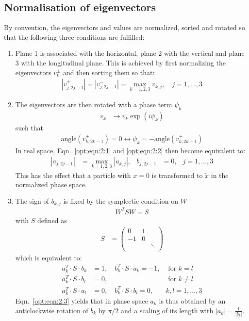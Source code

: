\documentclass[english]{article}
\begin{document}
\subsection{Normalisation of eigenvectors}
\label{opt:sec:2}
By convention, the eigenvectors and values are normalized, sorted and rotated so that the following three conditions are fulfilled:
\begin{enumerate}
\item Plane 1 is associated with the horizontal, plane 2 with the vertical and plane 3 with the longitudinal plane. This is achieved by first normalizing the eigenvectors $v_k^{\pm}$ and then sorting them so that:
\begin{align}\label{opt:eqn:2:1}
|v_{j,2j-1}^{+}| =|v_{j,2j-1}^{-}| = \max_{k=1,2,3} v_{k,j}, \quad j=1,\ldots, 3
\end{align}
\item The eigenvectors are then rotated with a phase term $\psi_k$
\begin{align}
v_k& \to v_k \exp(i \psi_k) 
\end{align}
such that
\begin{align}\label{opt:eqn:2:2}
\mathrm{angle}(v_{k,2k-1}^{+})=0 \leftrightarrow \psi_k=-\mathrm{angle}(v_{k,2k-1}^{+})
\end{align}
In real space, Eqn.~\ref{opt:eqn:2:1} and \ref{opt:eqn:2:2} then become equivalent to:
\begin{align}
|a_{j,2j-1}| &=\max_{k=1,2,3} |a_{k,j}|,& b_{j,2 j-1}&=0, & j=1,\ldots, 3
\end{align}
This has the effect that a particle with $x=0$ is transformed to $\tilde x$ in the normalized phase space.
\item The sign of $b_{k,j}$ is fixed by the symplectic condition on $W$
\begin{align}
W^T S W = S
\end{align}
with $S$ defined as
\begin{align}
S&=\left(
\begin{array}{ccc}
0 & 1  &  \\
-1 & 0  &  \\
&    & \ddots \\
\end{array} 
\right)
\end{align}
which is equivalent to:
\begin{align}\label{opt:eqn:2:3}
a_k^T \cdot S \cdot b_k &=1, \quad b_k^T \cdot S \cdot a_k =-1, & \text{ for } k=l\nonumber\\
a_k^T \cdot S \cdot b_l &=0, & \text{ for }  k\not=l\\
a_k^T \cdot S \cdot a_l &=0, \quad b_k^T \cdot S \cdot b_l =0,  & k,l=1,\ldots,3 \nonumber
\end{align}
Eqn.~\ref{opt:eqn:2:3} yields that in phase space $a_k$ is thus obtained by an anticlockwise rotation of $b_k$ by $\pi/2$ and a scaling of its length with $|a_k|=\frac{1}{|b_k|}$.
\end{enumerate}
\end{document}
